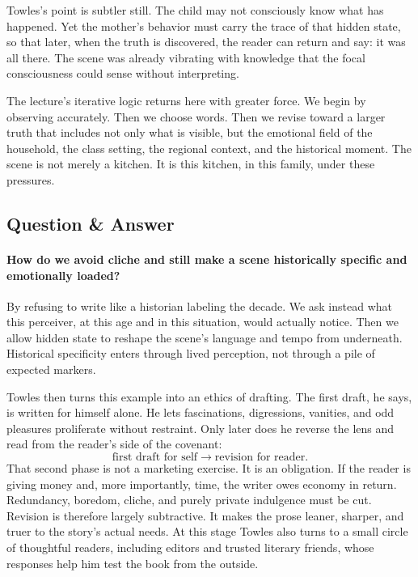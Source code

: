 Towles's point is subtler still. The child may not consciously know what has happened. Yet the mother's behavior must carry the trace of that hidden state, so that later, when the truth is discovered, the reader can return and say: it was all there. The scene was already vibrating with knowledge that the focal consciousness could sense without interpreting.

The lecture's iterative logic returns here with greater force. We begin by observing accurately. Then we choose words. Then we revise toward a larger truth that includes not only what is visible, but the emotional field of the household, the class setting, the regional context, and the historical moment. The scene is not merely a kitchen. It is this kitchen, in this family, under these pressures.

\subsection{Question \& Answer}

\paragraph{How do we avoid cliche and still make a scene historically specific and emotionally loaded?}

By refusing to write like a historian labeling the decade. We ask instead what this perceiver, at this age and in this situation, would actually notice. Then we allow hidden state to reshape the scene's language and tempo from underneath. Historical specificity enters through lived perception, not through a pile of expected markers.

Towles then turns this example into an ethics of drafting. The first draft, he says, is written for himself alone. He lets fascinations, digressions, vanities, and odd pleasures proliferate without restraint. Only later does he reverse the lens and read from the reader's side of the covenant:
\begin{equation}
\text{first draft for self} \longrightarrow \text{revision for reader}.
\end{equation}
That second phase is not a marketing exercise. It is an obligation. If the reader is giving money and, more importantly, time, the writer owes economy in return. Redundancy, boredom, cliche, and purely private indulgence must be cut. Revision is therefore largely subtractive. It makes the prose leaner, sharper, and truer to the story's actual needs. At this stage Towles also turns to a small circle of thoughtful readers, including editors and trusted literary friends, whose responses help him test the book from the outside.

